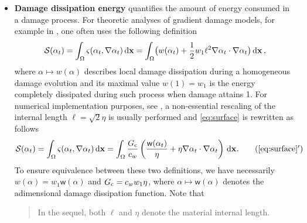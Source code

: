 \begin{itemize}
\item \textbf{Damage dissipation energy} quantifies the amount of energy consumed in a damage process. For theoretic analyses of gradient damage models, for example in \cite{PhamAmorMarigoMaurini:2011,SicsicMarigo:2013}, one often uses the following definition
\begin{equation} \label{eq:surface}
\mathcal{S}(\alpha_t)=\int_\Omega\varsigma(\alpha_t,\nabla\alpha_t)\dx=\int_\Omega\bigl(w(\alpha_t)+\frac{1}{2}w_1\ell^2\nabla\alpha_t\cdot\nabla\alpha_t\bigr)\dx\,,
\end{equation}
where $\alpha\mapsto w(\alpha)$ describes local damage dissipation during a homogeneous damage evolution and its maximal value $w(1)=w_1$ is the energy completely dissipated during such process when damage attains 1. For numerical implementation purposes, see \cite{BourdinMarigoMauriniSicsic:2014,MesgarnejadBourdinKhonsari:2014}, a non-essential rescaling of the internal length $\ell=\sqrt{2}\eta$ is usually performed and \eqref{eq:surface} is rewritten as follows
\begin{align} \label{eq:surfaceGc}
\mathcal{S}(\alpha_t)=\int_\Omega\varsigma(\alpha_t,\nabla\alpha_t)\dx=\int_\Omega\frac{\gc}{c_w}\left(\frac{\mathsf{w}(\alpha_t)}{\eta}+\eta\nabla\alpha_t\cdot\nabla\alpha_t\right)\dx. \tag{\ref*{eq:surface}${}^\prime$}
\end{align}
To ensure equivalence between these two definitions, we have necessarily $w(\alpha)=w_1\mathsf{w}(\alpha)$ and $G_\mathrm{c}=c_ww_1\eta$, where $\alpha\mapsto\mathsf{w}(\alpha)$ denotes the adimensional damage dissipation function. Note that
\begin{quotation}
In the sequel, both $\ell$ and $\eta$ denote the material internal length.
\end{quotation}
\end{itemize}

